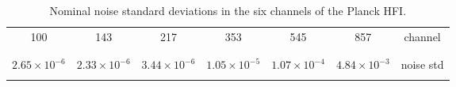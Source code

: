 \begin{table}[!h]
  \begin{center}
     \footnotesize {
    \begin{tabular}{@{} cccccc|c @{}}
      100&143&217&353&545&857&channel \\
          & & & & & &\\
  \hline
          & & & & & &\\
    $ 2.65\!\!\times\!\!10^{-6}$&$2.33\!\!\times\!\!10^{-6}$&$3.44\!\!\times\!\!10^{-6}$&$1.05\!\!\times\!\!10^{-5}$&$1.07\!\!\times\!\!10^{-4}$& $4.84\!\!\times\!\!10^{-3}$ &noise std\\
          & & & & & &\\
      \end{tabular}}
    \caption{Nominal noise standard deviations in the six channels of the Planck HFI.}\label{NoiseScale}
  \end{center}
\end{table}

